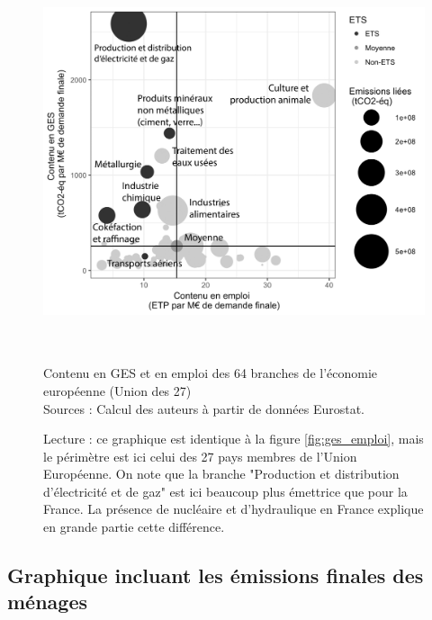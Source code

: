 \begin{figure}[!h]
	\centering
	\includegraphics[height=11cm]{figures/GES_et_emplois/GES_emploi_EU.pdf}
	\caption{Contenu en GES et en emploi des 64 branches de l'économie européenne (Union des 27) \\
		Sources : Calcul des auteurs à partir de données Eurostat.}
	\label{fig:ges_emploi_EU}
	\captionsetup{justification=raggedright}
	\caption*{Lecture : ce graphique est identique à la figure \ref{fig:ges_emploi}, mais le périmètre est ici celui des 27 pays membres de l'Union Européenne. On note que la branche "Production et distribution d'électricité et de gaz" est ici beaucoup plus émettrice que pour la France. La présence de nucléaire et d'hydraulique en France explique en grande partie cette différence.}
\end{figure}


\clearpage
\subsection{Graphique incluant les émissions finales des ménages}
\label{app:emissions_menages}

